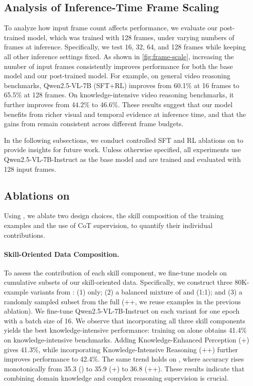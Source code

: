 
\subsection{Analysis of Inference-Time Frame Scaling}
\label{sec:6.2}

To analyze how input frame count affects performance, we evaluate our post-trained model, which was trained with 128 frames, under varying numbers of frames at inference. Specifically, we test 16, 32, 64, and 128 frames while keeping all other inference settings fixed. As shown in \autoref{fig:frame-scale}, increasing the number of input frames consistently improves performance for both the base model and our post-trained model. For example, on general video reasoning benchmarks, Qwen2.5-VL-7B (SFT+RL) improves from 60.1\% at 16 frames to 65.5\% at 128 frames. On knowledge-intensive video reasoning benchmarks, it further improves from 44.2\% to 46.6\%. These results suggest that our model benefits from richer visual and temporal evidence at inference time, and that the gains from \ours remain consistent across different frame budgets.

In the following subsections, we conduct controlled SFT and RL ablations on \ours to provide insights for future work. Unless otherwise specified, all experiments use Qwen2.5-VL-7B-Instruct as the base model and are trained and evaluated with 128 input frames.

\subsection{Ablations on \sftdata}
\label{sec:6.3}
Using \sftdata, we ablate two design choices, the skill composition of the training examples and the use of CoT supervision, to quantify their individual contributions.

\vspace{-8pt}
\paragraph{Skill-Oriented Data Composition.}
To assess the contribution of each skill component, we fine-tune models on cumulative subsets of our skill-oriented data. Specifically, we construct three 80K-example variants from \sftdata: (1) \vr only; (2) a balanced mixture of \vr and \kv (1:1); and (3) a randomly sampled subset from the full \sftdata (\ie \vr+\kv+\kvr, we reuse examples in the previous ablation). We fine-tune Qwen2.5-VL-7B-Instruct on each variant for one epoch with a batch size of 16.
We observe that incorporating all three skill components yields the best knowledge-intensive performance: training on \vr alone obtains 41.4\% on knowledge-intensive benchmarks. Adding Knowledge-Enhanced Perception (\vr+\kv) gives 41.3\%, while incorporating Knowledge-Intensive Reasoning (\vr+\kv+\kvr) further improves performance to 42.4\%. The same trend holds on \eval, where accuracy rises monotonically from 35.3 (\vr) to 35.9 (\vr+\kv) to 36.8 (\vr+\kv+\kvr). These results indicate that combining domain knowledge and complex reasoning supervision is crucial.

